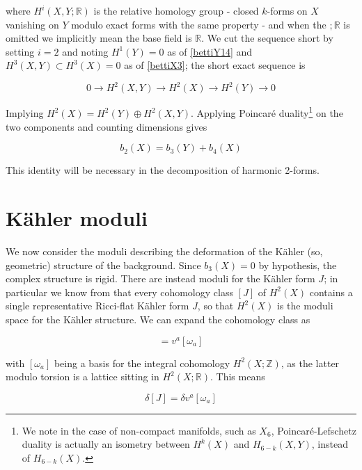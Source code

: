 where $H^i(X,Y;\mathbb{R})$ is the relative homology group - closed $k$-forms on $X$ vanishing on $Y$ modulo exact forms with the same property - and when the $;\mathbb{R}$ is omitted we implicitly mean the base field is $\mathbb{R}$. We cut the sequence short by setting $i=2$ and noting $H^1(Y) = 0$ as of \ref{bettiY14} and $H^3(X,Y) \subset H^3(X) = 0$ as of \ref{bettiX3}; the short exact sequence is

\begin{equation}
	0 \rightarrow H^2(X,Y) \rightarrow H^2(X) \rightarrow H^2(Y) \rightarrow 0
\end{equation}

Implying $H^2(X) = H^2(Y) \oplus H^2(X,Y)$. Applying Poincaré duality\footnote{We note in the case of non-compact manifolds, such as $X_6$, Poincar\'e-Lefschetz duality is actually an isometry between $H^k(X)$ and $H_{6-k}(X,Y)$, instead of $H_{6-k}(X)$.} on the two components and counting dimensions gives

\begin{equation}
	b_2(X) = b_3(Y) + b_4(X) \label{bettidentity}
\end{equation}

This identity will be necessary in the decomposition of harmonic 2-forms.

\section{K\"ahler moduli}

We now consider the moduli describing the deformation of the K\"ahler (so, geometric) structure of the background. Since $b_3(X) = 0$ by hypothesis, the complex structure is rigid. There are instead moduli for the K\"ahler form $J$; in particular we know from  that every cohomology class $[J]$ of $H^2(X)$ contains a single representative Ricci-flat K\"ahler form $J$, so that $H^2(X)$ is the moduli space for the K\"ahler structure. We can expand the cohomology class as

\begin{equation}
	[J] = v^a [\omega_a] \label{integraldecomposition}
\end{equation}

with $[\omega_a]$ being a basis for the integral cohomology $H^2(X;\mathbb Z)$, as the latter modulo torsion is a lattice sitting in $H^2(X;\mathbb R)$. This means

\begin{equation}
	\delta [J] = \delta v^a [\omega_a]
\end{equation}

